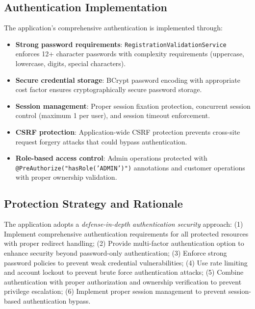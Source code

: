 \documentclass[]{UCD_CS_FYP_Report}
\begin{document}
\subsection{Authentication Implementation}
The application's comprehensive authentication is implemented through:
\begin{itemize}
	\item \textbf{Strong password requirements}: \texttt{RegistrationValidationService} enforces 12+ character passwords with complexity requirements (uppercase, lowercase, digits, special characters).
	\item \textbf{Secure credential storage}: BCrypt password encoding with appropriate cost factor ensures cryptographically secure password storage.
	\item \textbf{Session management}: Proper session fixation protection, concurrent session control (maximum 1 per user), and session timeout enforcement.
	\item \textbf{CSRF protection}: Application-wide CSRF protection prevents cross-site request forgery attacks that could bypass authentication.
	\item \textbf{Role-based access control}: Admin operations protected with \texttt{@PreAuthorize("hasRole('ADMIN')")} annotations and customer operations with proper ownership validation.
\end{itemize}

\subsection{Protection Strategy and Rationale}
The application adopts a \textit{defense-in-depth authentication security} approach: (1) Implement comprehensive authentication requirements for all protected resources with proper redirect handling; (2) Provide multi-factor authentication option to enhance security beyond password-only authentication; (3) Enforce strong password policies to prevent weak credential vulnerabilities; (4) Use rate limiting and account lockout to prevent brute force authentication attacks; (5) Combine authentication with proper authorization and ownership verification to prevent privilege escalation; (6) Implement proper session management to prevent session-based authentication bypass.
\end{document}
